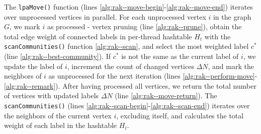 

The \texttt{lpaMove()} function (lines \ref{alg:rak--move-begin}-\ref{alg:rak--move-end}) iterates over unprocessed vertices in parallel. For each unprocessed vertex $i$ in the graph $G$, we mark $i$ as processed - vertex pruning (line \ref{alg:rak--prune}), obtain the total edge weight of connected labels in per-thread hashtable $H_t$ with the \texttt{scanCommunities()} function \ref{alg:rak--scan}, and select the most weighted label $c^*$ (line \ref{alg:rak--best-community}). If $c^*$ is not the same as the current label of $i$, we update the label of $i$, increment the count of changed vertices $\Delta N$, and mark the neighbors of $i$ as unprocessed for the next iteration (lines \ref{alg:rak--perform-move}-\ref{alg:rak--remark}). After having processed all vertices, we return the total number of vertices with updated labels $\Delta N$ (line \ref{alg:rak--move-return}). The \texttt{scanCommunities()} (lines \ref{alg:rak--scan-begin}-\ref{alg:rak--scan-end}) iterates over the neighbors of the current vertex $i$, excluding itself, and calculates the total weight of each label in the hashtable $H_t$.
